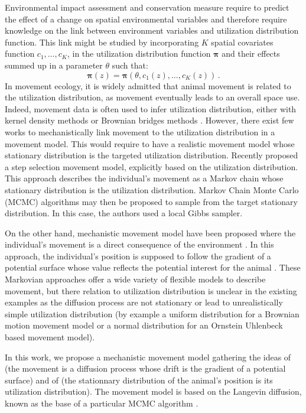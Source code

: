 \documentclass[10pt,a4paper]{article}
\newcommand{\ud}{\boldsymbol{\pi}}
\begin{document}
Environmental impact assessment and conservation measure require to predict the effect of a change on spatial environmental variables and therefore require knowledge on the link between environment variables and utilization distribution function. This link might be studied by incorporating  $K$ spatial covariates function $c_1, \dots, c_K$, in the utilization distribution function $\ud$  and their effects summed up in a parameter $\theta$ such that: 
\begin{equation}
\label{eq:ParUD}
\ud(z) = \ud (\theta, c_1(z), \dots, c_K(z))\,.
\end{equation}
In movement ecology, it is widely admitted that animal movement is related to the utilization distribution, as movement eventually leads to an overall space use. Indeed, movement data is often used to infer utilization distribution, either with kernel density methods \citep{worton1989kernel, fleming2015rigorous} or Brownian bridges methods \citep{horne2007analyzing}. However, there exist few works to mechanistically link movement to the utilization distribution in a movement model. This would require to have a realistic movement model whose stationary distribution is the targeted utilization distribution.
Recently  \citet{michelot2017linking} proposed a step selection movement model, explicitly based on the utilization distribution. This approach describes the individual's movement as a Markov chain whose stationary distribution is the utilization distribution. Markov Chain Monte Carlo (MCMC) algorithms may then be proposed to sample from the target stationary distribution. In this case, the authors used a local Gibbs sampler.

On the other hand, mechanistic movement model have been proposed where the individual's movement is a direct consequence of the environment \citep{brillinger2010handbook}. In this approach, the individual's position is supposed to follow the gradient of a potential surface whose value reflects the potential interest for the animal \citep{preisler2013analyzing}. These Markovian approaches offer a wide variety of flexible models to describe movement, but there relation to utilization distribution is unclear in the existing examples as the diffusion process are not stationary \citep{gloaguen2017stochastic}  or lead to unrealistically simple utilization distribution (by example a uniform distribution for a Brownian motion movement model or a normal distribution for an Ornstein Uhlenbeck based movement model).

In this work, we propose a mechanistic movement model gathering the ideas of \citet{brillinger2010handbook} (the movement is a diffusion process whose drift is the gradient of a potential surface) and of \citet{michelot2017linking} (the stationnary distribution of the animal's position is its  utilization distribution). The movement model is based on the Langevin diffusion, known as the base of a particular MCMC algorithm \citep{roberts1998optimal}.
\end{document}
